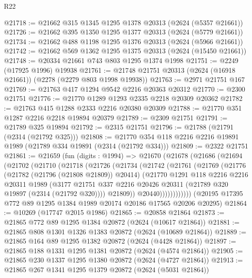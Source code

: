 \begin{lexlean}{R22}
\begin{coremodule}
@21718 := @21662 @315 @1345 @1295 @1378 @20313 (@2624 (@5357 @21661))
@21726 := @21662 @395 @1350 @1295 @1377 @20313 (@2624 (@5779 @21661))
@21734 := @21662 @488 @1198 @1295 @1376 @20313 (@2624 (@5966 @21661))
@21742 := @21662 @569 @1362 @1295 @1375 @20313 (@2624 (@15450 @21661))
@21748 := @20334 @21661 @743 @803 @1295 @1374 @1998
@21751 := @2249 (@17925 @1996) @19938
@21761 := @21748 @21751 @20313 (@2624 (@16918 @21661)) (@2278 (@2279 @803 @1998 @19938))
@21763 := @2971 @21751 @167
@21769 := @21763 @417 @1294 @9542 @2216 @20363 @20312
@21770 := @2300 @21751
@21776 := @21770 @1289 @1293 @2335 @2218 @20309 @20362
@21782 := @21763 @415 @1288 @2333 @2216 @20380 @20309
@21788 := @21770 @351 @1287 @2216 @2218 @19894 @20379
@21789 := @2309 @21751
@21791 := @21789 @325 @19894
@21792 := @2315 @21751
@21796 := @21788 (@21791 (@2314 (@21792 @325)))
@21808 := @21770 @354 @118 @2216 @2216 @19891 @1989 (@21789 @334 @19891 (@2314 (@21792 @334)))
@21809 := @2322 @21751
@21861 := @21659
    (fun (digits : @1994) =>
    @21670
      (@21678
        (@21686
          (@21694
            (@21702
              (@21710
                (@21718
                  (@21726
                    (@21734
                      (@21742
                        (@21761
                          (@21769
                            (@21776
                              (@21782 (@21796 (@21808 @21809)) @20414)
                              (@21770
                                @1291
                                @118
                                @2216
                                @2216
                                @20311
                                @1989
                                (@3177
                                  @21751
                                  @337
                                  @2216
                                  @20426
                                  @20311
                                  (@21789 @320 @19897 (@2314 (@21792 @320))))
                                @21809))
                            @20440))))))))))))
    (@20195 @17395 @772 @89 @1295 @1384 @1989 @20174 @20186 @17565 @20206 @20295)
@21864 := @10269 (@17747 @2015 @1986)
@21865 := @20858 @21864
@21873 := @21865 @772 @89 @1295 @1384 @20872 (@2624 (@10617 @21864))
@21881 := @21865 @808 @1301 @1326 @1383 @20872 (@2624 (@10689 @21864))
@21889 := @21865 @164 @89 @1295 @1382 @20872 (@2624 (@4428 @21864))
@21897 := @21865 @188 @1331 @1295 @1381 @20872 (@2624 (@4574 @21864))
@21905 := @21865 @230 @1337 @1295 @1380 @20872 (@2624 (@4727 @21864))
@21913 := @21865 @267 @1341 @1295 @1379 @20872 (@2624 (@5031 @21864))

\end{coremodule}
\end{lexlean}

